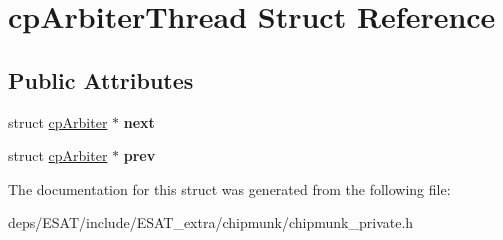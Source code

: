 \hypertarget{structcp_arbiter_thread}{}\section{cp\+Arbiter\+Thread Struct Reference}
\label{structcp_arbiter_thread}
\subsection*{Public Attributes}
\begin{DoxyCompactItemize}
\item 
\mbox{\label{structcp_arbiter_thread_a90b8cd36d8dbd5e009f3afc80258b016}} 
struct \mbox{\hyperlink{structcp_arbiter}{cp\+Arbiter}} $\ast$ {\bfseries next}
\item 
\mbox{\label{structcp_arbiter_thread_af85aac7e35c26147d4f4864a2b6f27fe}} 
struct \mbox{\hyperlink{structcp_arbiter}{cp\+Arbiter}} $\ast$ {\bfseries prev}
\end{DoxyCompactItemize}


The documentation for this struct was generated from the following file\+:\begin{DoxyCompactItemize}
\item 
deps/\+E\+S\+A\+T/include/\+E\+S\+A\+T\+\_\+extra/chipmunk/chipmunk\+\_\+private.\+h\end{DoxyCompactItemize}
